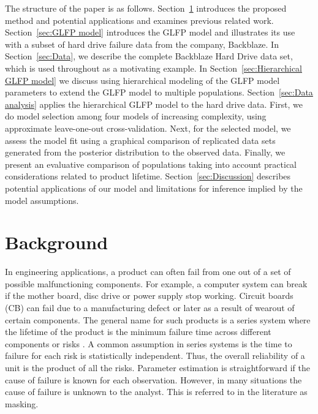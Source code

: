 \documentclass[12pt]{article}
\begin{document}
The structure of the paper is as follows. Section~\ref{sec:Background} introduces the proposed method and potential applications and examines previous related work.  Section~\ref{sec:GLFP model} introduces the GLFP model and illustrates its use with a subset of hard drive failure data from the company, Backblaze.  In Section~\ref{sec:Data}, we describe the complete Backblaze Hard Drive data set, which is used throughout as a motivating example. In Section~\ref{sec:Hierarchical GLFP model} we discuss using hierarchical modeling of the GLFP model parameters to extend the GLFP model to multiple populations. Section~\ref{sec:Data analysis} applies the hierarchical GLFP model to the hard drive data. First, we do model selection among four models of increasing complexity, using approximate leave-one-out cross-validation. Next, for the selected model, we assess the model fit using a graphical comparison of replicated data sets generated from the posterior distribution to the observed data. Finally, we present an evaluative comparison of populations taking into account practical considerations related to product lifetime. Section~\ref{sec:Discussion} describes potential applications of our model and limitations for inference implied by the model assumptions.

\section{Background}
\label{sec:Background}
In engineering applications, a product can often fail from one out of a set of possible malfunctioning components.  For example, a computer system can break if the mother board, disc drive or power supply stop working.  Circuit boards (CB) can fail due to a manufacturing defect or later as a result of wearout of certain components.  The general name for such products is a series system where the lifetime of the product is the minimum failure time across different components or risks \citep[Chapter 5]{nelson}.  A common assumption in series systems is the time to failure for each risk is statistically independent.  Thus, the overall reliability of a unit is the product of all the risks.  Parameter estimation is straightforward if the cause of failure is known for each observation.  However, in many situations the cause of failure is unknown to the analyst. This is referred to in the literature as masking.\\
\end{document}

